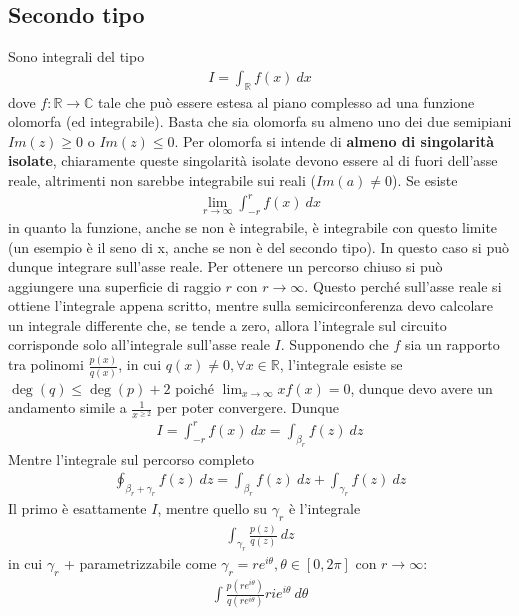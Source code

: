 \documentclass[a4paper, oneside]{article}
\begin{document}
\subsection{Secondo tipo}
Sono integrali del tipo 
\begin{align}
    I = \int_{\mathbb{R}} f(x) \ dx 
\end{align}
dove $f : \mathbb{R} \to \mathbb{C}$ tale che può essere estesa 
al piano complesso ad una funzione olomorfa (ed integrabile). Basta che 
sia olomorfa su almeno uno dei due semipiani $Im(z) \geq 0$ o $Im(z) \leq 0$. Per 
olomorfa si intende di \textbf{almeno di singolarità isolate}, chiaramente queste singolarità 
isolate devono essere al di fuori dell'asse reale, altrimenti non sarebbe integrabile 
sui reali ($Im(a) \neq 0$). Se esiste 
\begin{gather*}
    \lim_{r \to \infty } \int_{-r}^{r} f(x)  \ dx  
\end{gather*}
in quanto la funzione, anche se non è integrabile, è integrabile con questo 
limite (un esempio è il seno di x, anche se non è del secondo tipo). In questo 
caso si può dunque integrare sull'asse reale. Per ottenere un percorso 
chiuso si può aggiungere una superficie di raggio $r$ con $r \to \infty $. Questo perché 
sull'asse reale si ottiene l'integrale appena scritto, mentre sulla semicirconferenza 
devo calcolare un integrale differente che, se tende a zero, allora l'integrale sul circuito 
corrisponde solo all'integrale sull'asse reale $I$. Supponendo che
$f$ sia un rapporto tra polinomi $\frac{p(x)}{q(x)}$, in cui $q(x) \neq 0, \forall x \in \mathbb{R}$, 
l'integrale esiste se $\deg(q) \leq \deg(p) + 2$ poiché $\lim_{x \to \infty }xf(x)  = 0$, dunque devo avere 
un andamento simile a $\frac{1}{x^{\geq 2}}$ per poter convergere. Dunque 
\begin{gather*}
    I = \int_{-r}^{r} f(x)  \ dx = \int_{\beta_r} f(z) \ dz
\end{gather*}
Mentre l'integrale sul percorso completo 
\begin{gather*}
    \oint_{\beta_r + \gamma_r} f(z) \ dz = \int_{\beta_r} f(z) \ dz + \int_{\gamma_r} f(z) \ dz 
\end{gather*}
Il primo è esattamente $I$, mentre quello su $\gamma_r$ è l'integrale 
\begin{gather*}
    \int_{\gamma_r}^{}  \frac{p(z)}{q(z)} \ dz 
\end{gather*}
in cui $\gamma_r$ + parametrizzabile come $\gamma_r = re^{i\theta}, \theta \in [0, 2\pi]$ con $r \to \infty $:
\begin{gather*}
    \int \frac{p(re^{i\theta})}{q(re^{i\theta})} rie^{i\theta} \ d\theta 
\end{gather*}
\end{document}
